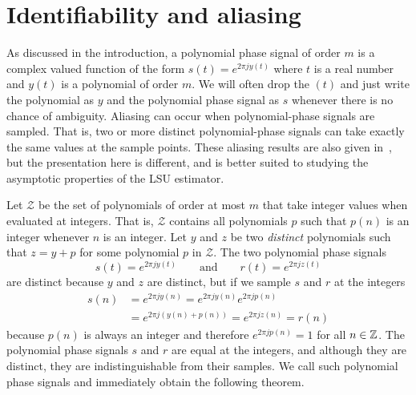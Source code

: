 \documentclass[journal]{IEEEtran}
\begin{document}
\section{Identifiability and aliasing}\label{sec:ident_aliasing}

As discussed in the introduction, a polynomial phase signal of order $m$ is a complex valued function of the form $s(t) = e^{2\pi j y(t)}$ where $t$ is a real number and $y(t)$ is a polynomial of order $m$. We will often drop the $(t)$ and just write the polynomial as $y$ and the polynomial phase signal as $s$ whenever there is no chance of ambiguity. %
Aliasing can occur when polynomial-phase signals are sampled.  That is, two or more distinct polynomial-phase signals can take exactly the same values at the sample points.  These aliasing results are also given in~\cite{McKilliam2009IndentifiabliltyAliasingPolyphase}, but the presentation here is different, and is better suited to studying the asymptotic properties of the LSU estimator.  %

Let $\mathcal{Z}$ be the set of polynomials of order at most $m$ that take integer values when evaluated at integers. That is, $\mathcal{Z}$ contains all polynomials $p$ such that $p(n)$ is an integer whenever $n$ is an integer.
Let $y$ and $z$ be two \emph{distinct} polynomials such that $z = y + p$ for some polynomial $p$ in $\mathcal{Z}$. The two polynomial phase signals
\[
s(t) = e^{2\pi j y(t)} \qquad \text{and} \qquad r(t) = e^{2\pi j z(t)}
\]
are distinct because $y$ and $z$ are distinct, but if we sample $s$ and $r$ at the integers  
\begin{align*}
s(n) &= e^{2\pi j y(n)} =  e^{2\pi j y(n)} e^{2\pi j p(n)} \\
&= e^{2\pi j (y(n) + p(n))} = e^{2\pi j z(n)} = r(n)
\end{align*}
because $p(n)$ is always an integer and therefore $e^{2\pi j p(n)} = 1$ for all $n \in {\mathbb Z}$. The polynomial phase signals $s$ and $r$ are equal at the integers, and although they are distinct, they are indistinguishable from their samples. We call such polynomial phase signals  and immediately obtain the following theorem.
\end{document}
